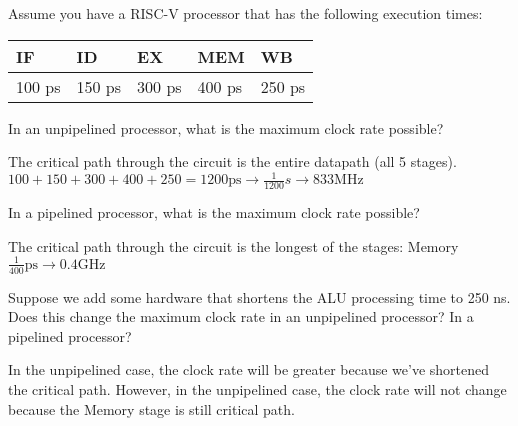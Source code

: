 \begin{blocksection}
\question
Assume you have a RISC-V processor that has the following execution times:

\begin{tabular}{ |l|l|l|l|l| } 
 \hline
 IF & ID & EX & MEM & WB \\
 \hline
 100 ps & 150 ps & 300 ps & 400 ps & 250 ps \\
 \hline
\end{tabular}

\begin{parts}
\item In an unpipelined processor, what is the maximum clock rate possible?

\begin{solution}[0.5in]
The critical path through the circuit is the entire datapath (all 5 stages).
$100 + 150 + 300 + 400 + 250 = 1200 \text{ps} \rightarrow \frac{1}{1200} s \rightarrow 833 \text{MHz}$
\end{solution}

\item In a pipelined processor, what is the maximum clock rate possible?

\begin{solution}[0.5in]
The critical path through the circuit is the longest of the stages: Memory
$\frac{1}{400} \text{ps} \rightarrow 0.4 \text{GHz}$
\end{solution}

\item Suppose we add some hardware that shortens the ALU processing time to 250 ns. Does this change the maximum clock rate in an unpipelined processor? In a pipelined processor?

\begin{solution}[0.5in]
In the unpipelined case, the clock rate will be greater because we’ve shortened the critical path. However, in the unpipelined case, the clock rate will not change because the Memory stage is still critical path.
\end{solution}

\end{parts}
\end{blocksection}